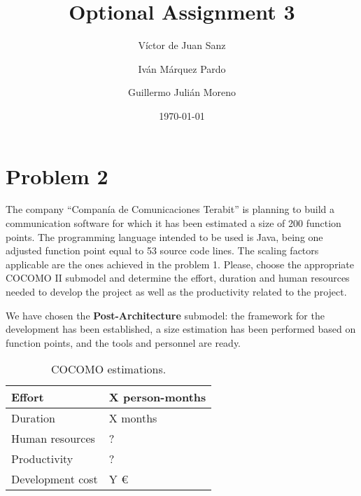 \documentclass{article}
\title{Optional Assignment 3}
\date{\today}
\author{V\'ictor de Juan Sanz \and Iv\'an M\'arquez Pardo\and Guillermo Juli\'an Moreno}
\newcommand{\seprule}{{\color{gray} \noindent \hspace{40pt} \hrulefill \hspace{40pt} \vspace{13pt}}}
\begin{document}
\maketitle



\newpage
\section{Problem 2}

The company ``Compan\'ia de Comunicaciones Terabit'' is planning to build a communication software for which it has been estimated a size of 200 function points. The programming language intended to be used is Java, being one adjusted function point equal to 53 source code lines. The scaling factors applicable are the ones achieved in the problem 1. Please, choose the appropriate COCOMO II submodel and determine the effort, duration and human resources needed to develop the project as well as the productivity related to the project.

\seprule

We have chosen the \textbf{Post-Architecture} submodel: the framework for the development has been established, a size estimation has been performed based on function points, and the tools and personnel are ready.


\begin{table}[hbtp]
\centering
\begin{tabular}{l|l}
Effort & X person-months \\ \hline
Duration & X months \\ \hline
Human resources & ? \\ \hline
Productivity & ? \\ \hline
Development cost & Y \euro
\end{tabular}
\caption{COCOMO estimations.}
\label{tblProblem1}
\end{table}

\newpage
\appendix


\end{document}
